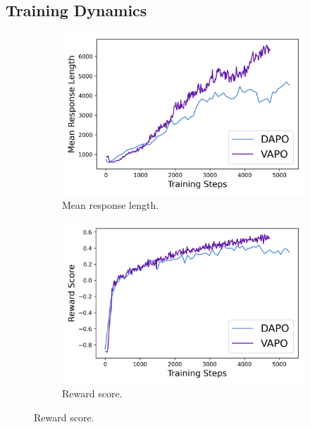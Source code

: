 \subsection{Training Dynamics}

\begin{figure}[t]
    \centering
    \begin{subfigure}{0.45\textwidth}
        \centering
        \includegraphics[width=\textwidth]{fig/length.png}
        \caption{Mean response length.}
        \label{subfig:length}
    \end{subfigure}
    \begin{subfigure}{0.45\textwidth}
        \centering
        \includegraphics[width=\textwidth]{fig/reward.png}
        \caption{Reward score.}
        \label{subfig:reward}

\end{subfigure}
\end{figure}
